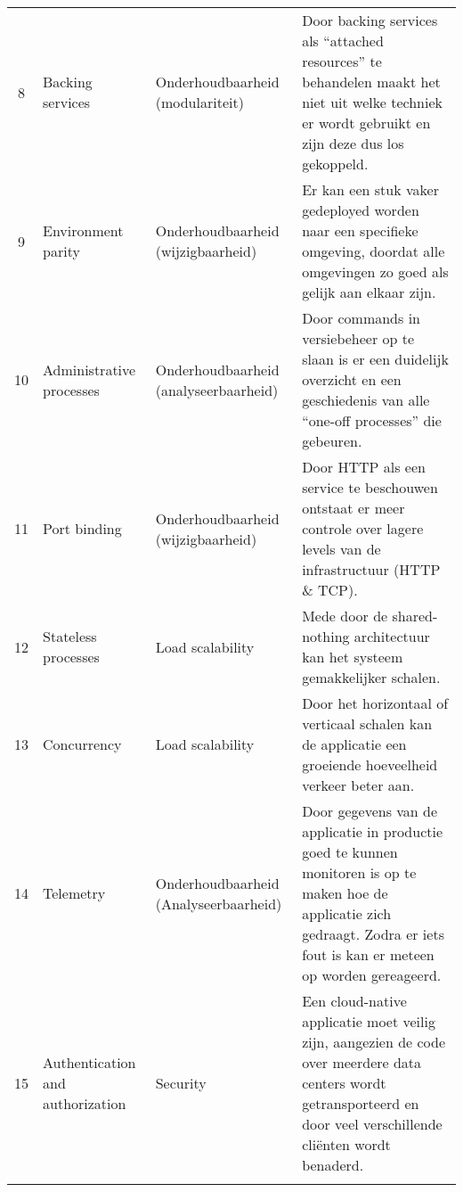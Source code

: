 \begin{longtable}[c]{c p{3cm} p{3.5cm} p{5.5cm}}
	8 & Backing services & Onderhoudbaarheid (modulariteit) & Door backing services als \enquote{attached resources} te behandelen maakt het niet uit welke techniek er wordt gebruikt en zijn deze dus los gekoppeld. \\
	9 & Environment parity & Onderhoudbaarheid (wijzigbaarheid) & Er kan een stuk vaker gedeployed worden naar een specifieke omgeving, doordat alle omgevingen zo goed als gelijk aan elkaar zijn. \\
	10 & Administrative processes & Onderhoudbaarheid (analyseerbaarheid) & Door commands in versiebeheer op te slaan is er een duidelijk overzicht en een geschiedenis van alle \enquote{one-off processes} die gebeuren. \\
	11 & Port binding & Onderhoudbaarheid (wijzigbaarheid) & Door HTTP als een service te beschouwen ontstaat er meer controle over lagere levels van de infrastructuur (HTTP \& TCP). \\
	12 & Stateless processes & Load scalability & Mede door de shared-nothing architectuur kan het systeem gemakkelijker schalen. \\
	13 & Concurrency & Load scalability &  Door het horizontaal of verticaal schalen kan de applicatie een groeiende hoeveelheid verkeer beter aan. \\
	14 & Telemetry & Onderhoudbaarheid (Analyseerbaarheid) & Door gegevens van de applicatie in productie goed te kunnen monitoren is op te maken hoe de applicatie zich gedraagt. Zodra er iets fout is kan er meteen op worden gereageerd. \\
	15 & Authentication and authorization & Security & Een cloud-native applicatie moet veilig zijn, aangezien de code over meerdere data centers wordt getransporteerd en door veel verschillende cliënten wordt benaderd. \\
	\bottomrule\\
\end{longtable}